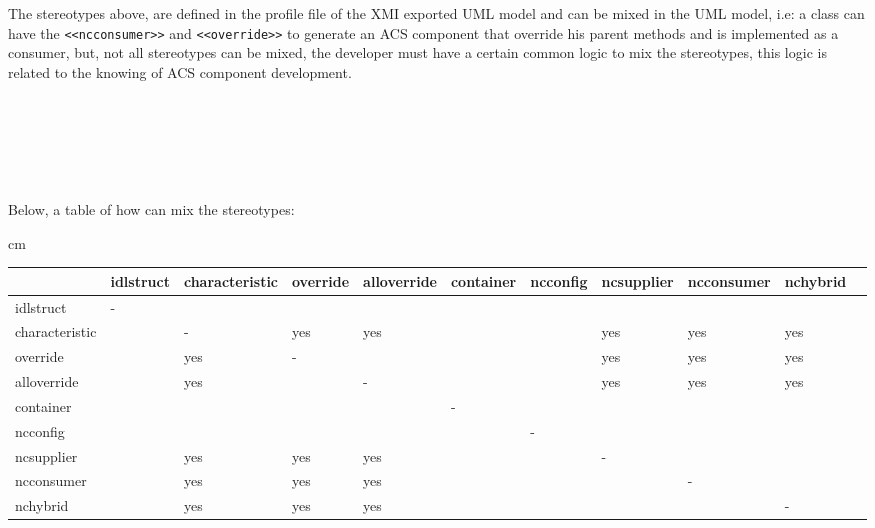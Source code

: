 The stereotypes above, are defined in the profile file of the XMI
exported UML model and can be mixed in the UML model, i.e: a class can have the 
\verb+<<ncconsumer>>+ and  \verb+<<override>>+ to generate an ACS component that
override his parent methods and is implemented as a consumer, but, not all
stereotypes can be mixed, the developer must have a certain common logic to mix
the stereotypes, this logic is related to the knowing of ACS component
development.
\\
\\
\\
\\
\\
\\
\\
Below, a table of how can mix the stereotypes:
\\
\begin {small} 
\begin{center}
\normalsize
{} cm
 \begin{tabular}{| l | l | l | l | l | l | l | l | l | l | l |}
    \hline
  & \scriptsize idlstruct & \scriptsize characteristic & \scriptsize override & \scriptsize alloverride & \scriptsize container & \scriptsize ncconfig & \scriptsize ncsupplier & \scriptsize ncconsumer & \scriptsize nchybrid \\ \hline
 \scriptsize idlstruct & - &  &  & &  &  &  &  & \\ \hline 
 \scriptsize characteristic & &- & \scriptsize yes & \scriptsize yes & & & \scriptsize yes & \scriptsize yes & \scriptsize yes\\ \hline
 \scriptsize override & & \scriptsize yes &- & & & & \scriptsize yes & \scriptsize yes& \scriptsize yes\\ \hline 
 \scriptsize alloverride & & \scriptsize yes & &- & & &\scriptsize yes &\scriptsize yes &\scriptsize yes\\ \hline 
 \scriptsize container & & & & & -& & & &\\ \hline 
 \scriptsize ncconfig & & & & & & -& & &\\ \hline 
 \scriptsize ncsupplier & &\scriptsize yes &\scriptsize yes &\scriptsize yes & & &- & &\\ \hline 
 \scriptsize ncconsumer & &\scriptsize yes &\scriptsize yes &\scriptsize yes & & & &- &\\ \hline 
 \scriptsize nchybrid & &\scriptsize yes &\scriptsize yes &\scriptsize yes & & & & &-\\ \hline
\end{tabular}
\end{center}
\end{small}
\normalsize

